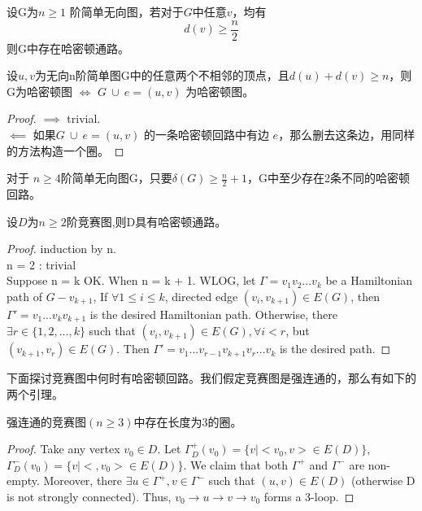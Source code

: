 \documentclass[11pt,fleqn]{book} %
\begin{document}
\begin{CJK}{UTF8}{gkai}
\begin{corollary}
    设G为$n \geq 1$ 阶简单无向图，若对于$G$中任意$v$，均有
    \[
        d(v)\geq \frac n 2\]
    则G中存在哈密顿通路。
\end{corollary}

\begin{theorem}
    设$u,v$为无向n阶简单图G中的任意两个不相邻的顶点，且$d(u) + d(v) \geq n$，则 \\
    G为哈密顿图 $\iff$ $G \ \cup \ e = (u, v)$ 为哈密顿图。
\end{theorem}
\begin{proof}
    $\implies$ trivial. \\
    $\impliedby$ 如果$G \ \cup \ e = (u, v)$ 的一条哈密顿回路中有边 $e$，那么删去这条边，用同样的方法构造一个圈。
\end{proof}

\begin{example}
    对于 $n \geq 4$阶简单无向图G，只要$\delta(G) \geq \frac n 2 + 1$，G中至少存在2条不同的哈密顿回路。
\end{example}

\begin{theorem}
    设$D$为$n \geq 2$阶竞赛图,则D具有哈密顿通路。
\end{theorem}
\begin{proof}
    induction by n. \\
    n = 2 : trivial \\
    Suppose n = k OK. When n = k + 1. WLOG, let $\Gamma = v_1v_2...v_k$ be a Hamiltonian path of $G - v_{k+1}$,
    If $\forall 1\leq i \leq k$, directed edge $(v_i, v_{k+1}) \in E(G)$, then $\Gamma' = v_1...v_kv_{k+1}$ is the desired Hamiltonian path. 
    Otherwise, there $\exists r \in \{1,2, ... ,k\}$ such that $(v_i, v_{k+1}) \in E(G), \forall i < r$, but $(v_{k+1}, v_r) \in E(G)$. Then $\Gamma' = v_1...v_{r-1}v_{k+1}v_r...v_k$ 
    is the desired path.   
\end{proof}

下面探讨竞赛图中何时有哈密顿回路。我们假定竞赛图是强连通的，那么有如下的两个引理。

\begin{lemma}
    强连通的竞赛图$(n\geq 3)$中存在长度为3的圈。
\end{lemma}
\begin{proof}
    Take any vertex $v_0 \in D$. Let $\Gamma_D^+(v_0) = \{v|<v_0, v> \in E(D)\}$, $\Gamma_D^-(v_0) = \{v|<, v_0> \in E(D)\}$.
    We claim that both $\Gamma^+$ and $\Gamma^-$ are non-empty. Moreover, there $\exists u \in \Gamma^+, v \in \Gamma^-$ such that
    $(u, v) \in E(D)$ (otherwise D is not strongly connected). Thus, $v_0 \to u \to v \to v_0$ forms a 3-loop.
\end{proof}


\end{CJK}
\end{document}

